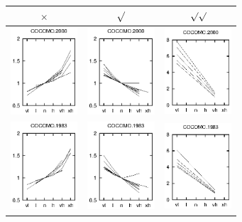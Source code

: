\begin{figure}
\begin{center}
\begin{tabular}{c|c|c}
$\times$ & $\surd$ & $\surd\surd$ \\\hline
\includegraphics[width=2.5cm]{coc2000down.eps}&
\includegraphics[width=2.5cm]{coc2000up.eps}&
\includegraphics[width=2.5cm]{coc2000cliff.eps}\\

\includegraphics[width=2.5cm]{coc1983down.eps}&
\includegraphics[width=2.5cm]{coc1983up.eps}&
\includegraphics[width=2.5cm]{coc1983cliff.eps}\\


\end{tabular}
\end{center}
\end{figure}
